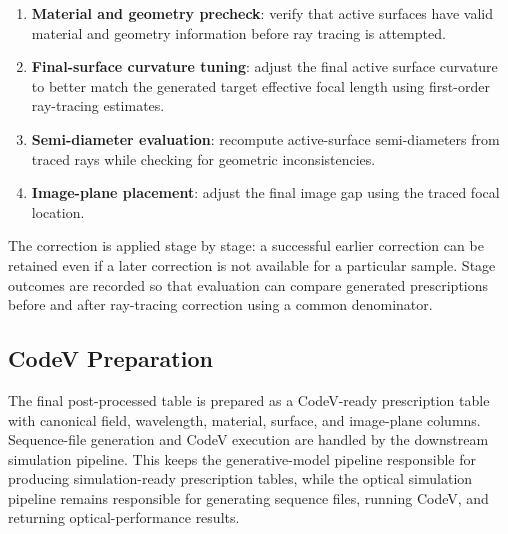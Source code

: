 \begin{enumerate}
    \item \textbf{Material and geometry precheck}: verify that active surfaces have valid material and geometry information before ray tracing is attempted.
    \item \textbf{Final-surface curvature tuning}: adjust the final active surface curvature to better match the generated target effective focal length using first-order ray-tracing estimates.
    \item \textbf{Semi-diameter evaluation}: recompute active-surface semi-diameters from traced rays while checking for geometric inconsistencies.
    \item \textbf{Image-plane placement}: adjust the final image gap using the traced focal location.
\end{enumerate}

The correction is applied stage by stage: a successful earlier correction can be retained even if a later correction is not available for a particular sample. Stage outcomes are recorded so that evaluation can compare generated prescriptions before and after ray-tracing correction using a common denominator.

\subsection{CodeV Preparation}

The final post-processed table is prepared as a CodeV-ready prescription table with canonical field, wavelength, material, surface, and image-plane columns. Sequence-file generation and CodeV execution are handled by the downstream simulation pipeline. This keeps the generative-model pipeline responsible for producing simulation-ready prescription tables, while the optical simulation pipeline remains responsible for generating sequence files, running CodeV, and returning optical-performance results.

